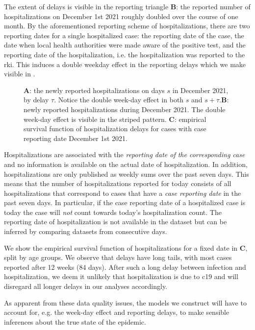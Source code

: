 The extent of delays is visible in the reporting triangle  \textbf{B}: the reported number of hospitalizations on December 1st 2021 roughly doubled over the course of one month. By the aforementioned reporting scheme of hospitalizations, there are two reporting dates for a single hospitalized case: the reporting date of the case, the date when local health authorities were made aware of the positive test, and the reporting date of the hospitalization, i.e. the hospitalization was reported to the \acrshort{rki}. This induces a double weekday effect in the reporting delays which we make visible in .

\begin{figure}
    \resizebox{\textwidth}{!}{%
    }
    \caption{\textbf{A}: the newly reported hospitalizations on days $s$ in December 2021, by delay $\tau$. Notice the double week-day effect in both $s$ and $s+\tau$.\textbf{B}: newly reported hospitalizations during December 2021. The double week-day effect is visible in the striped pattern. \textbf{C}: empirical survival function of hospitalization delays for cases with case reporting date December 1st 2021.}
    \label{fig:double_weekday_effect_hosp}
\end{figure}

Hospitalizations are associated with the \emph{reporting date of the corresponding case} and no information is available on the actual date of hospitalization. In addition, hospitalizations are only published as weekly sums over the past seven days. This means that the number of hospitalizations reported for today consists of all hospitalizations that correspond to cases that have a \emph{case reporting date} in the past seven days. In particular, if the case reporting date of a hospitalized case is today the case will \emph{not} count towards today's hospitalization count. The reporting date of hospitalization is not available in the dataset but can be inferred by comparing datasets from consecutive days.

We show the empirical survival function of hospitalizations for a fixed date in  \textbf{C}, split by age groups. We observe that delays have long tails, with most cases reported after 12 weeks (84 days). After such a long delay between infection and hospitalization, we deem it unlikely that hospitalization is due to \acrshort{c19} and will disregard all longer delays in our analyses accordingly. 



As apparent from these data quality issues, the models we construct will have to account for, e.g. the week-day effect and reporting delays, to make sensible inferences about the true state of the epidemic. 